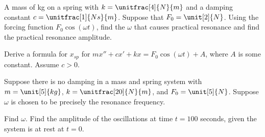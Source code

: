 \setcounter{exercise}{100}

\begin{exercise}
A mass of \unit[4]{kg} on a spring with $k=\unitfrac[4]{N}{m}$ and a damping
constant $c=\unitfrac[1]{Ns}{m}$.
Suppose that $F_0 = \unit[2]{N}$.
Using the forcing function $F_0 \cos (\omega t)$,
find the $\omega$ that causes practical resonance and find the
practical resonance amplitude.
\end{exercise}

\begin{exercise}
Derive a formula for $x_{sp}$ for
$mx''+cx'+kx = F_0 \cos(\omega t) + A$,
where $A$ is some constant.  Assume $c > 0$.
\end{exercise}

\begin{exercise}
Suppose there is no damping in a mass and spring system with
$m = \unit[5]{kg}$, $k= \unitfrac[20]{N}{m}$, and $F_0 = \unit[5]{N}$.  Suppose $\omega$ is chosen
to be precisely the resonance frequency.
\begin{tasks}
\task
Find $\omega$.
\task
Find the amplitude of the oscillations at time $t=100$ seconds, given the system is at
rest at $t=0$.
\end{tasks}
\end{exercise}
